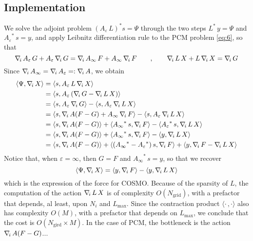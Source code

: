 \subsection{Implementation}
We solve the adjoint problem $(A_\varepsilon \, L )^* s = \Psi$ through the two steps ${L}^* \, y = \Psi$ and ${A_\varepsilon}^* \, s = y$, and apply Leibnitz differentiation rule to the PCM problem \eqref{eq:6}, so that
\[
\nabla_{\!i}\, A_\varepsilon \, G + A_\varepsilon \, \nabla_{\!i}\, G = \nabla_{\!i}\, A_\infty \, F + A_\infty \, \nabla_{\!i}\, F  \qquad , \qquad \nabla_{\!i}\, L \, X + L \, \nabla_{\!i}\, X = \nabla_{\!i}\, G
\]
Since $\nabla_{\!i}\, A_\infty=\nabla_{\!i}\, A_\varepsilon =: \nabla_{\!i}\, A$, we obtain
\begin{align*}
\langle \Psi , \nablai X\rangle &  = \langle s ,  A_\varepsilon \, L \, \nablai X\rangle \\
&  = \langle s ,  A_\varepsilon \,( \nablai G - \nablai L \,  X ) \rangle \\ 
& = \langle s ,  A_\varepsilon \, \nablai G \rangle - \langle s , A_\varepsilon \, \nablai L \,  X \rangle \\
& = \langle s , \nablai  A ( F - G ) + A_\infty \, \nablai F \rangle - \langle s , A_\varepsilon \, \nablai L \,  X \rangle \\
& = \langle s , \nablai  A ( F - G ) \rangle + \langle {A_\infty}^* \, s , \nablai F \rangle - \langle {A_\varepsilon}^* \, s , \nablai L \,  X \rangle \\
& = \langle s , \nablai  A ( F - G ) \rangle + \langle {A_\infty}^* \, s , \nablai F \rangle - \langle y , \nablai L \,  X \rangle\\
& = \langle s , \nablai  A ( F - G ) \rangle + \langle ({A_\infty}^*-{A_\varepsilon}^*) \, s , \nablai F \rangle + \langle y, \nablai F-\nablai L \,  X \rangle 
\end{align*}
Notice that, when $\varepsilon = \infty$, then $G = F$ and ${A_\infty}^* \, s =y$, so that we recover
\[
\langle \Psi , \nabla_{\!i}\, X\rangle =  \langle y , \nabla_{\!i}\, F \rangle - \langle y , \nabla_{\!i}\, L \,  X \rangle
\]
which is the expression of the force for COSMO. Because of the sparsity of $L$, the computation of the action $\nabla_{\!i}\, L \, X$ is of complexity $O(N_\text{grid})$, with a prefactor that depends, al least, upon $N_i$ and $L_\text{max}$. Since the contraction product $\langle \cdot \, , \cdot \rangle$ also has complexity $O(M)$, with a prefactor that depends on $L_\text{max}$, we conclude that the cost is $O(N_\text{gird} \times M)$. In the case of PCM, the bottleneck is the action $ \nabla_{\!i}\,  A ( F - G)$...

